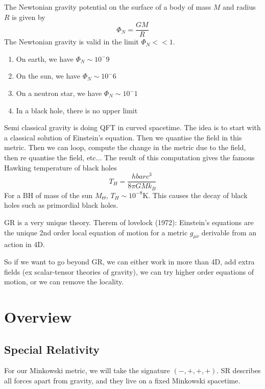 \documentclass[a4paper]{book}
\theoremstyle{definition}
\theoremstyle{remark}
\begin{document}
The Newtonian gravity potential on the surface of a body of mass $M$ and radius $R$ is given by 
\begin{equation}
    \Phi_N = \frac{GM}{R}
\end{equation}
The Newtonian gravity is valid in the limit $\Phi_N << 1$. 
\begin{enumerate}
    \item On earth, we have $\Phi_N \sim 10^-9$
    \item On the sun, we have $\Phi_N \sim 10^-6$
    \item On a neutron star, we have $\Phi_N \sim 10^-1$
    \item In a black hole, there is no upper limit
\end{enumerate}\bigskip \par \medskip 

Semi classical gravity is doing QFT in curved spacetime. The idea is to start with a classical solution of Einstein's equation. Then we quantise the field in this metric. Then we can loop, compute the change in the metric due to the field, then re quantise the field, etc... The result of this computation gives the famous Hawking temperature of black holes 
\begin{equation}
    T_H = \frac{hbarc^3}{8\pi GMk_B}
\end{equation}
For a BH of mass of the sun $M_\Theta$, $T_H \sim 10^{-8}$K. This causes the decay of black holes such as primordial black holes.\par \medskip 

GR is a very unique theory. Therem of lovelock (1972): Einstein's equations are the unique 2nd order local equation of motion for a metric $g_{\mu\nu}$ derivable from an action in 4D. \par 

So if we want to go beyond GR, we can either work in more than 4D, add extra fields (ex scalar-tensor theories of gravity), we can try higher order equations of motion, or we can remove the locality. 
\chapter{Overview}
\section{Special Relativity}

For our Minkowski metric, we will take the signature $(-, +, +, +)$. SR describes all forces apart from gravity, and they live on a fixed Minkowski spacetime. \par \medskip 
\end{document}
